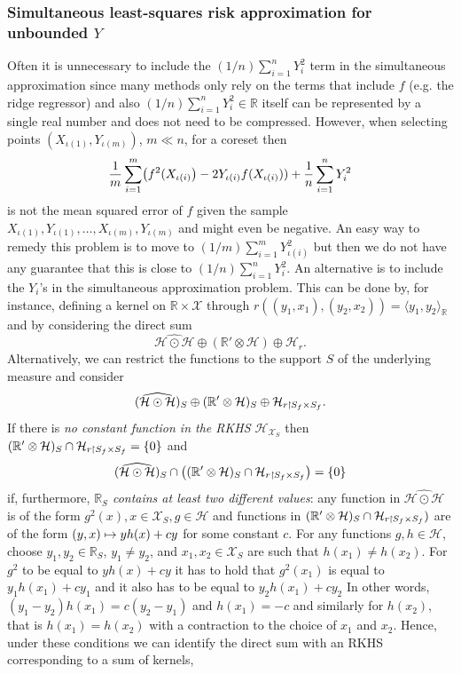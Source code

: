 \documentclass[10pt]{amsart}
\theoremstyle{definition}\newtheorem{defi}[theo]{Definition}\newtheorem{rema}[theo]{Remark}\newtheorem{exam}[theo]{Example}\newtheorem{exem}[theo]{Example}\newtheorem{nota}[theo]{Notation}
\theoremstyle{remark}
\newcommand{\R}{\mathbb{R}}
\newcommand{\dR}{{\R'}}
\newcommand{\X}{\mathcal{X}}
\newcommand{\cH}{\mathcal{H}}
\newcommand*{\mk}{\mkern -1mu}
\let\oldmapsto\mapsto
\renewcommand*{\mapsto}{\mathchoice{\longmapsto}{\oldmapsto}{\oldmapsto}{\oldmapsto}}
\let\originalleft\left
\let\originalright\right
\renewcommand{\left}{\mathopen{}\mathclose\bgroup\originalleft}
\renewcommand{\right}{\aftergroup\egroup\originalright}
\begin{document}
\subsubsection{Simultaneous least-squares risk approximation for unbounded \texorpdfstring{$Y$}{Y}} \label{sec:simult_risk}
Often it is unnecessary to include the $(1/n) \sum_{i=1}^n Y_i^2$ term in the simultaneous approximation since many methods only rely on the terms that include $f$ (e.g. the ridge regressor) and also $(1/n) \sum_{i=1}^n Y_i^2 \in \R$ itself can be represented by a single real number and does not need to be compressed. However, when selecting points $(X_{\iota(1)},Y_{\iota(m)})$, $m \ll n$, for a coreset then
\[
\frac{1}{m} \sum_{i=1}^m \left(f^2(X_{\iota(i)}\right) -2 Y_{\iota(i)} f(X_{\iota(i)})) + \frac{1}{n} \sum_{i=1}^n Y_i^2
\]
is not the mean squared error of $f$ given the sample $X_{\iota(1)},Y_{\iota(1)}, \dots,X_{\iota(m)},Y_{\iota(m)}$ and might even be negative. An easy way to remedy this problem is to move to $(1/m) \sum_{i=1}^m Y_{\iota(i)}^2$ but then we do not have any guarantee that this is close to $(1/n) \sum_{i=1}^n Y_i^2$. An alternative is to include the $Y_i$'s in the simultaneous approximation problem. This can be done by, for instance, defining a kernel on $\R \times \X$ through $r((y_1,x_1),(y_2,x_2)) = \langle y_1, y_2 \rangle_\R$ and by considering the direct sum
\[
\widehat{\cH \odot \cH} \oplus (\dR \otimes \cH) \oplus \cH_r.
\]
Alternatively, we can restrict the functions to the support $S$ of the underlying measure and consider
\[
(\widehat{\cH \odot \cH})_S \oplus (\dR \otimes \cH)_S \oplus \cH_{r\mk\upharpoonright\mk S_f \times S_f}.
\]
If there is \emph{no constant function in the RKHS $\cH_{\X_S}$} then $(\dR \otimes \cH)_S \cap \cH_{r\mk\upharpoonright S_f \times S_f} = \{0\}$ and
\[
(\widehat{\cH \odot \cH})_S \cap \left((\dR \otimes \cH)_S \cap \cH_{r\upharpoonright\mk S_f \times S_f}\right) =\{0\}
\]
if, furthermore, \emph{$\R_S$ contains at least two different values}: any function in $\widehat{\cH \odot \cH}$ is of the form $g^2(x), x \in \X_S, g\in \cH$ and functions in $(\dR \otimes \cH)_S \cap \cH_{r\mk\upharpoonright\mk S_f \times S_f})$ are of the form $(y,x) \mapsto y h(x) + c y$ for some constant $c$. For any functions $g,h\in \cH$, choose $y_1, y_2 \in \R_S$, $y_1 \not = y_2$, and $x_1, x_2 \in \X_S$ are such that $h(x_1) \not = h(x_2)$. For $g^2$ to be equal to $yh(x) +cy$ it has to hold that $g^2(x_1)$ is equal to $y_1 h(x_1) + c y_1$ and it also has to be equal to $y_2 h(x_1) + c y_2$ In other words, $ (y_1 - y_2) h(x_1) = c (y_2 - y_1)$ and $h(x_1) = -c$ and similarly for $h(x_2)$, that is $h(x_1) = h(x_2)$ with a contraction to the choice of $x_1$ and $x_2$. Hence, under these conditions we can identify the direct sum with an RKHS corresponding to a sum of kernels,
\end{document}
